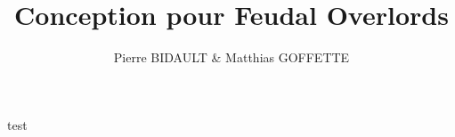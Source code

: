\documentclass[12pt,a4paper,draft]{article}
\author{Pierre BIDAULT \& Matthias GOFFETTE}
\title{Conception pour Feudal Overlords}
\begin{document}
test
\end{document}

